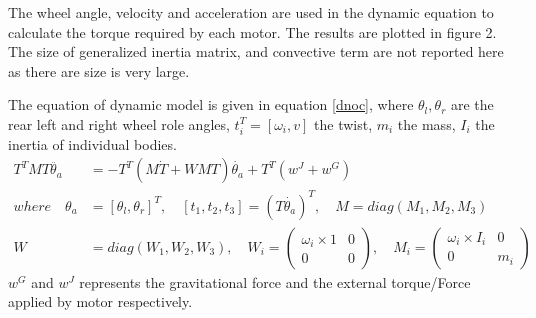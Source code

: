 The wheel angle, velocity and acceleration are used in the dynamic equation  to calculate the torque required by each motor. The results are plotted in figure 2.  The size of generalized inertia matrix,    and convective term   are not reported here as there are size is very large.


The equation of  dynamic model  is given in equation \ref{dnoc}, where $\theta_l, \theta_r $ are the rear left and right wheel role angles, $t_i^T=[\omega_i, v]$ the twist, $m_i$ the mass, $I_i$ the inertia of individual bodies.
\begin{equation}
\label{dnoc}
\begin{aligned}
T^TMT\ddot{\theta_a}&=-T^T(M\dot{T}+WMT)\dot{\theta_a}+T^T(w^J+w^G)\\
where\quad \theta_a&=[\theta_l, \theta_r]^T , \quad [t_1,t_2,t_3]=(T\dot{\theta_a})^T, \quad M=diag(M_1, M_2, M_3)\\
W&=diag(W_1,W_2,W_3),\quad W_i=\begin{pmatrix}
\omega_i\times 1 & 0\\ 0 & 0
\end{pmatrix},\quad M_i=\begin{pmatrix}
\omega_i\times I_i & 0\\ 0 & m_i
\end{pmatrix}
\end{aligned}
\end{equation}
$w^G$ and $ w^J$ represents the gravitational force and the external torque/Force applied by motor respectively. 

